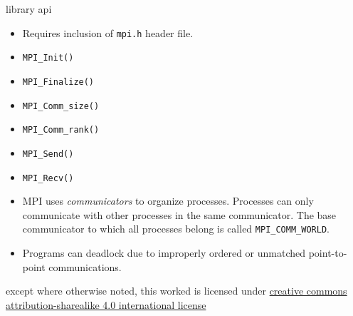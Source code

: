 \documentclass[10pt,t]{beamer}
\begin{document}
  \begin{frame}{library api}
    \begin{itemize}
      \item Requires inclusion of \texttt{mpi.h} header file.
    \end{itemize}

    \begin{itemize}
      \item \texttt{MPI\_Init()}
      \item \texttt{MPI\_Finalize()}
      \item \texttt{MPI\_Comm\_size()}
      \item \texttt{MPI\_Comm\_rank()}
      \item \texttt{MPI\_Send()}
      \item \texttt{MPI\_Recv()}
    \end{itemize}

    \begin{itemize}
      \item MPI uses \emph{communicators} to organize processes. Processes can
        only communicate with other processes in the same communicator. The base
        communicator to which all processes belong is called
        \texttt{MPI\_COMM\_WORLD}.

      \item Programs can deadlock due to improperly ordered or unmatched
        point-to-point communications.
    \end{itemize}
  \end{frame}

  \appendix

  \begin{frame}[c]
    \begin{center}\ccbysa\end{center}

    except where otherwise noted, this worked is licensed under
    \href{http://creativecommons.org/licenses/by-sa/4.0/}{creative commons
    attribution-sharealike 4.0 international license}
  \end{frame}
\end{document}
